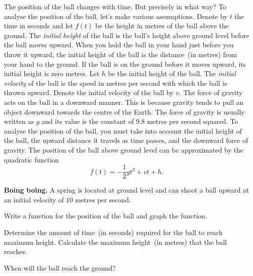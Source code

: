 \documentclass[a4paper,oneside,12pt]{article}
\begin{document}
The position of the ball changes with time.  But precisely in what
way?  To analyse the position of the ball, let's make various
assumptions.  Denote by $t$ the time in seconds and let $f(t)$ be the
height in metres of the ball above the ground.  The
\emph{initial height} of the ball is the ball's height above ground
level before the ball moves upward.  When you hold the ball in your
hand just before you throw it upward, the initial height of the ball
is the distance~(in metres) from your hand to the ground.  If the ball
is on the ground before it moves upward, its initial height is zero
metres.  Let $h$ be the initial height of the ball.  The
\emph{initial velocity} of the ball is the speed in metres per second
with which the ball is thrown upward.  Denote the initial velocity of
the ball by $v$.  The force of gravity acts on the ball in a downward
manner.  This is because gravity tends to pull an object downward
towards the centre of the Earth.  The force of gravity is usually
written as $g$ and its value is the constant of $9.8$ metres per
second squared.  To analyse the position of the ball, you must take
into account the initial height of the ball, the upward distance it
travels as time passes, and the downward force of gravity.  The
position of the ball above ground level can be approximated by the
quadratic function
\begin{equation}
\label{eqn:position_of_object_under_free_fall}
f(t)
=
-\frac{1}{2} gt^2 + vt + h.
\end{equation}

\begin{example}
\label{ex:spring_ball}
\textbf{Boing boing.}
A spring is located at ground level and can shoot a ball upward at an
initial velocity of $10$ metres per second.
\begin{packedenum}
\item\label{ex:spring_ball_graph}
  Write a function for the position of the ball and graph the
  function.

\item\label{ex:spring_ball_time_to_maximum_height}
  Determine the amount of time~(in seconds) required for the ball to
  reach maximum height.  Calculate the maximum height~(in metres) that
  the ball reaches.

\item\label{ex:spring_ball_time_hit_ground}
  When will the ball reach the ground?
\end{packedenum}
\end{example}
\end{document}
